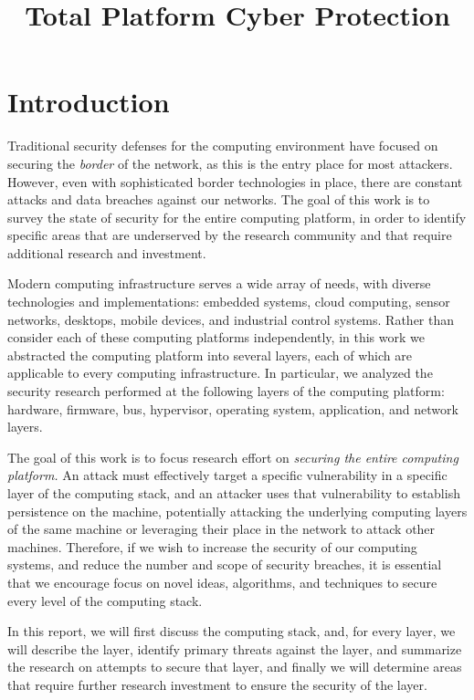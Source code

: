\documentclass[11pt,letterpaper]{article}
\begin{document}
\title{Total Platform Cyber Protection}
\date{}

\maketitle

\section{Introduction}

Traditional security defenses for the computing environment have
focused on securing the \emph{border} of the network, as this is the
entry place for most attackers. However, even with sophisticated
border technologies in place, there are constant attacks and data
breaches against our networks. The goal of this work is to survey the
state of security for the entire computing platform, in order to
identify specific areas that are underserved by the research community
and that require additional research and investment.

Modern computing infrastructure serves a wide array of needs, with
diverse technologies and implementations: embedded systems, cloud
computing, sensor networks, desktops, mobile devices, and industrial
control systems. Rather than consider each of these computing
platforms independently, in this work we abstracted the computing
platform into several layers, each of which are applicable to every
computing infrastructure. In particular, we analyzed the security
research performed at the following layers of the computing platform:
hardware, firmware, bus, hypervisor, operating system, application,
and network layers.

The goal of this work is to focus research effort on \emph{securing
  the entire computing platform.} An attack must effectively target a
specific vulnerability in a specific layer of the computing stack, and
an attacker uses that vulnerability to establish persistence on the
machine, potentially attacking the underlying computing layers of the
same machine or leveraging their place in the network to attack other
machines. Therefore, if we wish to increase the security of our
computing systems, and reduce the number and scope of security
breaches, it is essential that we encourage focus on novel ideas,
algorithms, and techniques to secure every level of the computing
stack.

In this report, we will first discuss the computing stack, and, for
every layer, we will describe the layer, identify primary threats
against the layer, and summarize the research on attempts to secure
that layer, and finally we will determine areas that require further
research investment to ensure the security of the layer.
\end{document}
